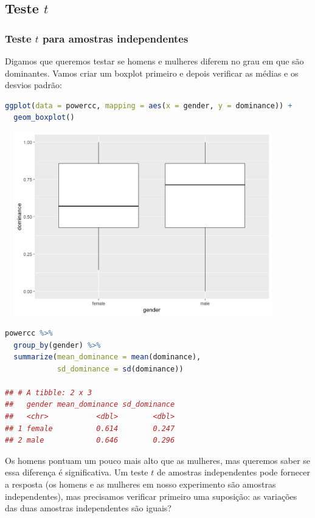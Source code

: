 \documentclass{article}
\begin{document}
\subsection{Teste $t$}
\subsubsection{Teste $t$ para amostras independentes}

Digamos que queremos testar se homens e mulheres diferem no grau em que são dominantes. Vamos criar um boxplot primeiro e depois verificar as médias e os desvios padrão:

\begin{lstlisting}[language=R]
ggplot(data = powercc, mapping = aes(x = gender, y = dominance)) + 
  geom_boxplot()
\end{lstlisting}

\begin{center}
\includegraphics[width=12cm,height=8cm]{bda_independent_ttest_boxplot-1.png}
\end{center}

\begin{lstlisting}[language=R]
powercc %>% 
  group_by(gender) %>% 
  summarize(mean_dominance = mean(dominance),
            sd_dominance = sd(dominance))
            
## # A tibble: 2 x 3
##   gender mean_dominance sd_dominance
##   <chr>           <dbl>        <dbl>
## 1 female          0.614        0.247
## 2 male            0.646        0.296
\end{lstlisting}

Os homens pontuam um pouco mais alto que as mulheres, mas queremos saber se essa diferença é significativa. Um teste $t$ de amostras independentes pode fornecer a resposta (os homens e as mulheres em nosso experimento são amostras independentes), mas precisamos verificar primeiro uma suposição: as variações das duas amostras independentes são iguais?
\end{document}
